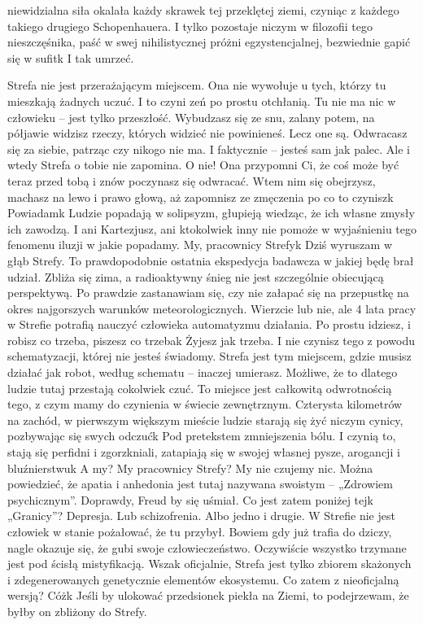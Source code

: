 \documentclass[../MAIN.tex]{subfiles}
\begin{document}
niewidzialna 
siła 
okalała każdy skrawek tej przeklętej ziemi, czyniąc z każdego takiego drugiego Schopenhauera. I tylko pozostaje niczym w filozofii tego nieszczęśnika, paść w swej nihilistycznej próżni egzystencjalnej, bezwiednie gapić się w sufit\3k I tak umrzeć.

Strefa nie jest przerażającym miejscem. Ona nie wywołuje u tych, którzy tu mieszkają żadnych uczuć. I to czyni zeń po prostu otchłanią. Tu nie ma nic w człowieku -- jest tylko przeszłość. Wybudzasz się ze snu, zalany potem, na półjawie widzisz rzeczy, których widzieć nie powinieneś. Lecz one są. Odwracasz się za siebie, patrząc czy nikogo nie ma. I faktycznie -- jesteś sam jak palec. Ale i wtedy Strefa o tobie nie zapomina. O nie! Ona przypomni Ci, że coś może być teraz przed tobą i znów poczynasz się odwracać. Wtem nim się obejrzysz, machasz na lewo i prawo głową, aż zapomnisz ze zmęczenia po co to czynisz\3k Powiadam\3k Ludzie popadają w solipsyzm, głupieją wiedząc, że ich własne zmysły ich zawodzą. I ani Kartezjusz, ani ktokolwiek inny nie pomoże w wyjaśnieniu tego fenomenu iluzji w jakie popadamy. My, pracownicy Strefy\3k
\vfill
% 
% 
Dziś wyruszam w głąb Strefy. To prawdopodobnie ostatnia ekspedycja badawcza w jakiej będę brał udział. Zbliża się zima, a radioaktywny śnieg nie jest szczególnie obiecującą perspektywą. Po prawdzie zastanawiam się, czy nie załapać się na przepustkę na okres najgorszych warunków meteorologicznych. Wierzcie lub nie, ale 4 lata pracy w Strefie potrafią nauczyć człowieka automatyzmu działania. Po prostu idziesz, i robisz co trzeba, piszesz co trzeba\3k Żyjesz jak trzeba. I nie czynisz tego z powodu schematyzacji, której nie jesteś świadomy. Strefa jest tym miejscem, gdzie musisz działać jak robot, według schematu -- inaczej umierasz. Możliwe, że to dlatego ludzie tutaj przestają cokolwiek czuć. To miejsce jest całkowitą odwrotnością tego, z czym mamy do czynienia w świecie zewnętrznym. Czterysta kilometrów na zachód, w pierwszym większym mieście ludzie starają się żyć niczym cynicy, pozbywając się swych odczuć\3k Pod pretekstem zmniejszenia bólu. I czynią to, stają się perfidni i zgorzkniali, zatapiają się w 
swojej 
własnej pysze, arogancji i bluźnierstwu\3k A my? My pracownicy Strefy? My nie czujemy nic. Można powiedzieć, że apatia i anhedonia jest tutaj nazywana swoistym -- „Zdrowiem psychicznym”. Doprawdy, Freud by się uśmiał. Co jest zatem poniżej tej\3k „Granicy”? Depresja. Lub schizofrenia. Albo jedno i drugie. W Strefie nie jest człowiek w stanie pożałować, że tu przybył. Bowiem gdy już trafia do dziczy, nagle okazuje się, że gubi swoje człowieczeństwo. Oczywiście wszystko trzymane jest pod ścisłą mistyfikacją. Wszak oficjalnie, Strefa jest tylko zbiorem skażonych i zdegenerowanych genetycznie elementów ekosystemu. Co zatem z nieoficjalną wersją? Cóż\3k Jeśli by ulokować przedsionek piekła na Ziemi, to podejrzewam, że byłby on zbliżony do Strefy.
\end{document}
